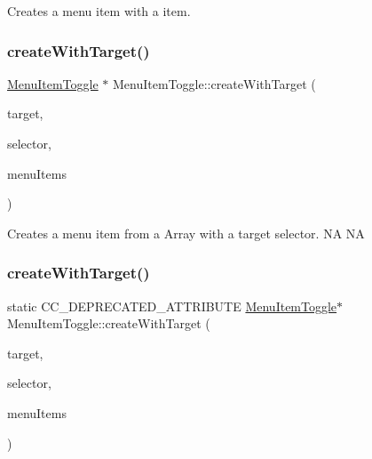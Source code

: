 Creates a menu item with a item. \mbox{\label{classMenuItemToggle_adb831c11bcd0f689b97d307b3430040d}} 
\subsubsection{\texorpdfstring{create\+With\+Target()}{createWithTarget()}\hspace{0.1cm}{\footnotesize\ttfamily [1/4]}}
{\footnotesize\ttfamily \hyperlink{classMenuItemToggle}{Menu\+Item\+Toggle} $\ast$ Menu\+Item\+Toggle\+::create\+With\+Target (\begin{DoxyParamCaption}\item[{\hyperlink{classRef}{Ref} $\ast$}]{target,  }\item[{S\+E\+L\+\_\+\+Menu\+Handler}]{selector,  }\item[{const \hyperlink{classVector}{Vector}$<$ \hyperlink{classMenuItem}{Menu\+Item} $\ast$$>$ \&}]{menu\+Items }\end{DoxyParamCaption})\hspace{0.3cm}{\ttfamily [static]}}

Creates a menu item from a Array with a target selector.  NA  NA \mbox{\label{classMenuItemToggle_a6743d3601d35f76a429e5722ad18e352}} 
\subsubsection{\texorpdfstring{create\+With\+Target()}{createWithTarget()}\hspace{0.1cm}{\footnotesize\ttfamily [2/4]}}
{\footnotesize\ttfamily static C\+C\+\_\+\+D\+E\+P\+R\+E\+C\+A\+T\+E\+D\+\_\+\+A\+T\+T\+R\+I\+B\+U\+TE \hyperlink{classMenuItemToggle}{Menu\+Item\+Toggle}$\ast$ Menu\+Item\+Toggle\+::create\+With\+Target (\begin{DoxyParamCaption}\item[{\hyperlink{classRef}{Ref} $\ast$}]{target,  }\item[{S\+E\+L\+\_\+\+Menu\+Handler}]{selector,  }\item[{const \hyperlink{classVector}{Vector}$<$ \hyperlink{classMenuItem}{Menu\+Item} $\ast$$>$ \&}]{menu\+Items }\end{DoxyParamCaption})\hspace{0.3cm}{\ttfamily [static]}}

